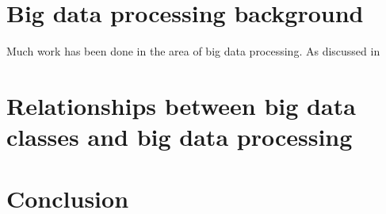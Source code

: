 \documentclass[a4paper,11pt]{article}
\begin{document}



\section{Big data processing background} %
\label{sec:big_data_processing_background}

Much work has been done in the area of big data processing. As discussed in



\section{Relationships between big data classes and big data processing} %
\label{sec:relationships_between_big_data_classes_and_big_data_processing}



\section{Conclusion} %
\label{sec:conclusion}


\newpage



\end{document}
